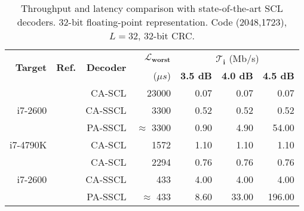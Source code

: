 \begin{table}[htp]
  \centering
  \caption{Throughput and latency comparison with state-of-the-art SCL decoders.
    32-bit floating-point representation. Code (2048,1723), $L = 32$, 32-bit
    CRC.}
  \label{tab:eval_polar_scl_perfs_comparison}
  \begin{tabular}{r r r r r r r}
    \multirow{2}{*}{\textbf{Target}} & \multirow{2}{*}{\textbf{Ref.}}        & \multirow{2}{*}{\textbf{Decoder}} & \multirow{1}{*}{\textbf{$\bm{\mathcal{L}_{worst}}$}} & \multicolumn{3}{c}{$\bm{\mathcal{T}_i}$ (Mb/s)} \\
    \cline{5-7}
                                     &                                       &                                   & ($\mu s$)                         & \textbf{3.5 dB} & \textbf{4.0 dB} & \textbf{4.5 dB} \\
    \hline
    \hline
    \multirow{3}{*}{i7-2600}         & \multirow{3}{*}{\cite{Sarkis2014b}}   & CA-SCL                            & 23000                             &  0.07           &  0.07           &   0.07          \\
                                     &                                       & CA-SSCL                           &  3300                             &  0.52           &  0.52           &   0.52          \\
                                     &                                       & PA-SSCL                           & $\approx$ 3300                    &  0.90           &  4.90           &  54.00          \\
    \hline
    \multirow{1}{*}{i7-4790K}        & \cite{Shen2016}                       & CA-SCL                            &  1572                             &  1.10           &  1.10           &   1.10          \\
    \hline
    \multirow{3}{*}{i7-2600}         & \multirow{3}{*}{\cite{Sarkis2016}}    & CA-SCL                            &  2294                             &  0.76           &  0.76           &   0.76          \\
                                     &                                       & CA-SSCL                           &   433                             &  4.00           &  4.00           &   4.00          \\
                                     &                                       & PA-SSCL                           & $\approx$ 433                     &  8.60           & 33.00           & 196.00          \\

\end{tabular}
\end{table}
